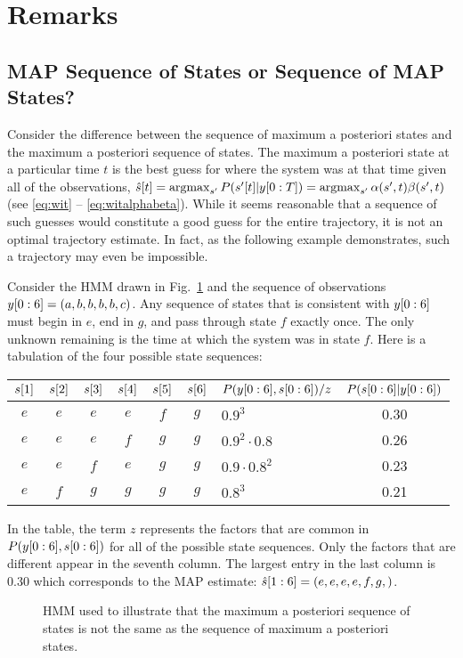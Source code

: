 \section{Remarks}
\label{sec:AlgApp}

\subsection{MAP Sequence of States or Sequence of MAP States?}
\label{sec:sequenceMAP}

%

Consider the difference between the sequence of maximum a posteriori states
and the maximum a posteriori sequence of states.  The maximum a posteriori state
at a particular time $t$ is the best guess for where the system was at
that time given all of the observations, \ie
%
${\hat s}{[t]} = \operatorname*{argmax}_{s'}P({s'}{[t]}|y[0:T]) =
\operatorname*{argmax}_{s'}\alpha(s',t) \beta(s',t)$
%
(see \eqref{eq:wit} --
\eqref{eq:witalphabeta}).  While it seems reasonable that a sequence
of such guesses would constitute a good guess for the entire
trajectory, it is not an optimal trajectory estimate.  In fact, as the
following example demonstrates, such a trajectory may even be
impossible.

Consider the HMM drawn in Fig.~\ref{fig:sequenceMAP} and the sequence
of observations $y[0:6] = (a,b,b,b,b,c)$.  Any sequence of
states that is consistent with $y[0:6]$ must begin in $e$, end
in $g$, and pass through state $f$ exactly once.  The only unknown
remaining is the time at which the system was in state $f$.  Here is a
tabulation of the four possible state sequences:
\begin{center}
  \begin{tabular}{|cccccc|l|c|}
    \hline
    ${s}{[1]}$ &  ${s}{[2]}$ &  ${s}{[3]}$ & 
    ${s}{[4]}$ &  ${s}{[5]}$ &  ${s}{[6]}$ &
    $P(y[0:6],s[0:6])/z$ & 
    $P(s[0:6]|y[0:6])$ \\
    \hline
    $e$ & $e$ & $e$ & $e$ & $f$ & $g$ & $0.9^3$           & 0.30 \\    $e$ & $e$ & $e$ & $f$ & $g$ & $g$ & $0.9^2\cdot 0.8$  & 0.26 \\
    $e$ & $e$ & $f$ & $e$ & $g$ & $g$ & $0.9 \cdot 0.8^2$ & 0.23 \\
    $e$ & $f$ & $g$ & $g$ & $g$ & $g$ & $0.8^3$           & 0.21 \\\hline
  \end{tabular}
\end{center}
In the table, the term $z$ represents the factors that are common in
$P(y[0:6],s[0:6])$ for all of the possible state
sequences.  Only the factors that are different appear in the seventh
column.  The largest entry in the last column is 0.30 which
corresponds to the MAP estimate: $\hat s[1:6] = (e,e,e,e,f,g,)$.
\begin{figure}[htbp]
  \centering{\plotsize%
     
  }  
  \caption{HMM used to illustrate that the maximum a posteriori sequence of states is
    not the same as the sequence of maximum a posteriori states.}
\label{fig:sequenceMAP}
\end{figure}

